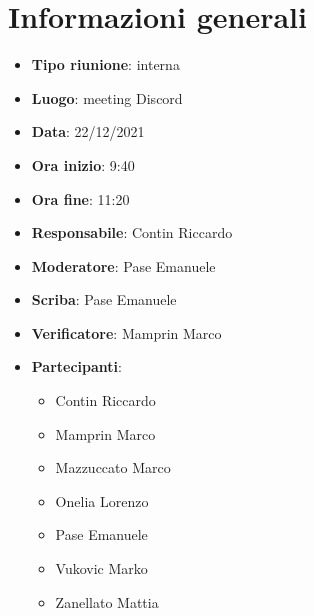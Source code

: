 \section{Informazioni generali}
\begin{itemize}
  \item \textbf{Tipo riunione}: interna
  \item \textbf{Luogo}: meeting Discord
  \item \textbf{Data}: 22/12/2021
  \item \textbf{Ora inizio}: 9:40
  \item \textbf{Ora fine}: 11:20
  \item \textbf{Responsabile}: Contin Riccardo
  \item \textbf{Moderatore}: Pase Emanuele
  \item \textbf{Scriba}: Pase Emanuele
  \item \textbf{Verificatore}: Mamprin Marco
  \item \textbf{Partecipanti}:
  \begin{itemize}
    \item Contin Riccardo
    \item Mamprin Marco
    \item Mazzuccato Marco
    \item Onelia Lorenzo
    \item Pase Emanuele
    \item Vukovic Marko
    \item Zanellato Mattia
  \end{itemize}
\end{itemize}
